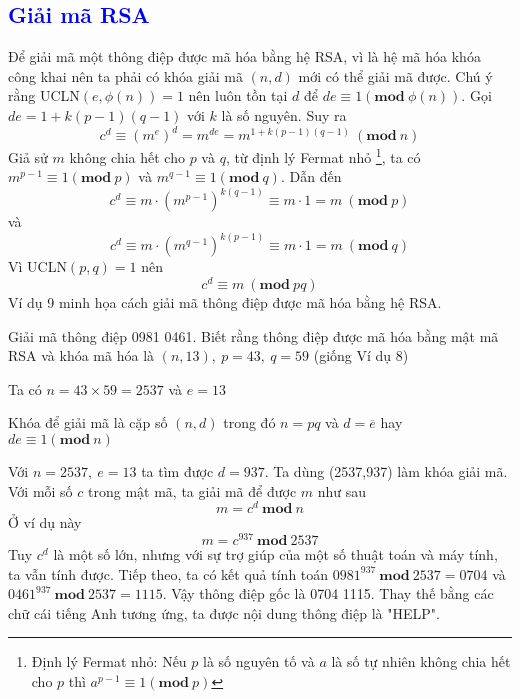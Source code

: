 \textcolor{blue}{\section{Giải mã RSA}}
Để giải mã một thông điệp được mã hóa bằng hệ RSA, vì là hệ mã hóa khóa công khai nên ta phải có khóa giải mã $(n,d)$ mới có thể giải mã được.
Chú ý rằng UCLN$(e,\phi(n)) = 1$ nên luôn tồn tại $d$ để $de \equiv 1 (\mathbf{mod}\ \phi(n))$.
Gọi $de = 1 + k(p-1)(q-1)$ với $k$ là số nguyên. Suy ra
$$c^d \equiv (m^e)^d = m^{de} = m^{1 + k(p-1)(q-1)}\ (\mathbf{mod}\ n)$$
Giả sử $m$ không chia hết cho $p$ và $q$, từ định lý Fermat nhỏ \footnote{Định lý Fermat nhỏ: Nếu $p$ là số nguyên tố và $a$ là số tự nhiên không chia hết cho $p$ thì $ a^{p-1} \equiv 1 (\mathbf{mod}\ p)$},
ta có $ m^{p-1} \equiv 1 (\mathbf{mod}\ p)$ và $ m^{q-1} \equiv 1 (\mathbf{mod}\ q)$. Dẫn đến
$$ c^d \equiv m \cdot (m^{p-1})^{k(q-1)} \equiv m \cdot 1 = m\ (\mathbf{mod}\ p)$$
và
$$ c^d \equiv m \cdot (m^{q-1})^{k(p-1)} \equiv m \cdot 1 = m\ (\mathbf{mod}\ q)$$
Vì UCLN$(p,q)=1$ nên
$$ c^d \equiv m\ (\mathbf{mod}\ pq)$$
Ví dụ 9 minh họa cách giải mã thông điệp được mã hóa bằng hệ RSA.

\begin{example}
    Giải mã thông điệp 0981 0461. Biết rằng thông điệp được mã hóa bằng mật mã RSA và khóa mã hóa là $(n,13),\ p=43,\ q=59$ (giống Ví dụ 8)
\end{example}
\begin{solution}
    Ta có $n = 43 \times 59 = 2537$ và $e = 13$

    Khóa để giải mã là cặp số $(n,d)$ trong đó $n=pq$ và $d = \overline{e}$ hay  $de \equiv 1 (\mathbf{mod}\ n)$

    Với $n=2537,\ e = 13$ ta tìm được $d=937$. Ta dùng (2537,937) làm khóa giải mã.
    Với mỗi số $c$ trong mật mã, ta giải mã để được $m$ như sau
    $$ m = c^d\ \mathbf{mod}\ n$$
    Ở ví dụ này
    $$ m = c^{937}\ \mathbf{mod}\ 2537$$
    Tuy $c^d$ là một số lớn, nhưng với sự trợ giúp của một số thuật toán và máy tính, ta vẫn tính được.
    Tiếp theo, ta có kết quả tính toán $0981^{937}\ \mathbf{mod}\ 2537 = 0704$ và $0461^{937}\ \mathbf{mod}\ 2537 = 1115$.
    Vậy thông điệp gốc là 0704 1115. Thay thế bằng các chữ cái tiếng Anh tương ứng, ta được nội dung thông điệp là "HELP".
\end{solution}